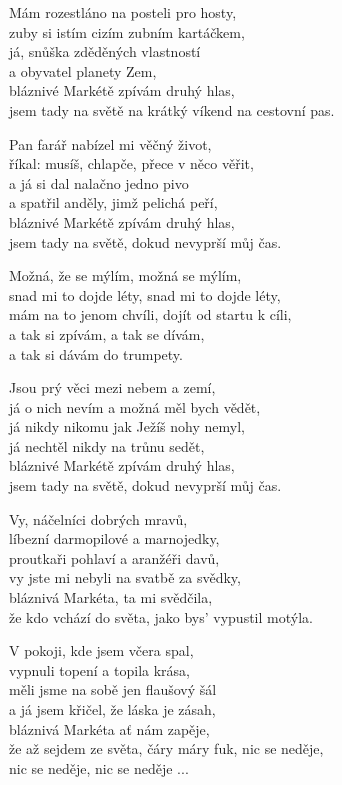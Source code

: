 
\ve{}
Mám rozestláno na posteli pro hosty,\\
zuby si istím cizím zubním kartáčkem,\\
já, snůška zděděných vlastností\\
a obyvatel planety Zem,\\
bláznivé Markétě zpívám druhý hlas,\\
jsem tady na světě na krátký víkend na cestovní pas. 

\ve{}
Pan farář nabízel mi věčný život,\\
říkal: musíš, chlapče, přece v něco věřit,\\
a já si dal nalačno jedno pivo\\
a spatřil anděly, jimž pelichá peří,\\
bláznivé Markétě zpívám druhý hlas,\\
jsem tady na světě, dokud nevyprší můj čas.

\cho{}
Možná, že se mýlím, možná se mýlím,\\
snad mi to dojde léty, snad mi to dojde léty,\\
mám na to jenom chvíli, dojít od startu k cíli,\\
a tak si zpívám, a tak se dívám,\\
a tak si dávám do trumpety. 

\ve{}
Jsou prý věci mezi nebem a zemí,\\
já o nich nevím a možná měl bych vědět,\\
já nikdy nikomu jak Ježíš nohy nemyl,\\
já nechtěl nikdy na trůnu sedět,\\
bláznivé Markétě zpívám druhý hlas,\\
jsem tady na světě, dokud nevyprší můj čas.

\ve{}
Vy, náčelníci dobrých mravů,\\
líbezní darmopilové a marnojedky,\\
proutkaři pohlaví a aranžéři davů,\\
vy jste mi nebyli na svatbě za svědky,\\
bláznivá Markéta, ta mi svědčila,\\
že kdo vchází do světa, jako bys' vypustil motýla.

\cho{}

\ve{}
V pokoji, kde jsem včera spal,\\
vypnuli topení a topila krása,\\
měli jsme na sobě jen flaušový šál\\
a já jsem křičel, že láska je zásah,\\
bláznivá Markéta ať nám zapěje,\\
že až sejdem ze světa, čáry máry fuk, nic se neděje,\\
nic se neděje, nic se neděje ...

\esong